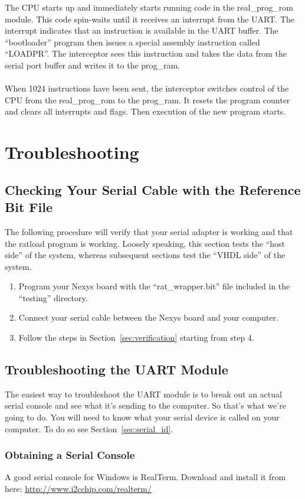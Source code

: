 \documentclass[notitlepage]{article}
\begin{document}
The CPU starts up and immediately starts running code in the real\_prog\_rom module. This code spin-waits until it receives an interrupt from the UART. The interrupt indicates that an instruction is available in the UART buffer. The ``bootloader'' program then issues a special assembly instruction called ``LOADPR''. The interceptor sees this instruction and takes the data from the serial port buffer and writes it to the prog\_ram.\\\\
When 1024 instructions have been sent, the interceptor switches control of the CPU from the real\_prog\_rom to the prog\_ram. It resets the program counter and clears all interrupts and flags. Then execution of the new program starts.

\section{Troubleshooting}
\label{sec:troubleshooting}

\subsection{Checking Your Serial Cable with the Reference Bit File}
The following procedure will verify that your serial adapter is working and that the ratload program is working. Loosely speaking, this section tests the ``host side'' of the system, whereas subsequent sections test the ``VHDL side'' of the system.

\begin{enumerate}
\item Program your Nexys board with the ``rat\_wrapper.bit'' file included in the ``testing'' directory.
\item Connect your serial cable between the Nexys board and your computer.
\item Follow the steps in Section~\ref{sec:verification} starting from step 4.
\end{enumerate}

\subsection{Troubleshooting the UART Module}
The easiest way to troubleshoot the UART module is to break out an actual serial console and see what it's sending to the computer. So that's what we're going to do. You will need to know what your serial device is called on your computer. To do so see Section~\ref{sec:serial_id}.
\subsubsection{Obtaining a Serial Console}
A good serial console for Windows is RealTerm. Download and install it from here: \url{http://www.i2cchip.com/realterm/}
\end{document}
